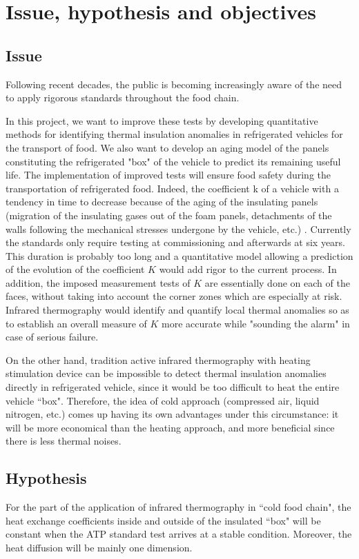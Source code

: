 \section*{Issue, hypothesis and objectives}
\subsection{Issue}

Following recent decades, the public is becoming increasingly aware of the need to apply rigorous standards throughout the food chain.

In this project, we want to improve these tests by developing quantitative methods for identifying thermal insulation anomalies in refrigerated vehicles for the transport of food. We also want to develop an aging model of the panels constituting the refrigerated "box" of the vehicle to predict its remaining useful life. The implementation of improved tests will ensure food safety during the transportation of refrigerated food.
Indeed, the coefficient k of a vehicle with a tendency in time to decrease because of the aging of the insulating panels (migration of the insulating gases out of the foam panels, detachments of the walls following the mechanical stresses undergone by the vehicle, etc.) . Currently the standards only require testing at commissioning and afterwards at six years. This duration is probably too long and a quantitative model allowing a prediction of the evolution of the coefficient $K$ would add rigor to the current process. In addition, the imposed measurement tests of $K$ are essentially done on each of the faces, without taking into account the corner zones which are especially at risk. Infrared thermography would identify and quantify local thermal anomalies so as to establish an overall measure of $K$ more accurate while "sounding the alarm" in case of serious failure.

On the other hand, tradition active infrared thermography with heating stimulation device can be impossible to detect thermal insulation anomalies directly in refrigerated vehicle, since it would be too difficult to heat the entire vehicle ``box". Therefore, the idea of cold approach (compressed air, liquid nitrogen, etc.) comes up having its own advantages under this circumstance: it will be more economical than the heating approach, and more beneficial since there is less thermal noises.

\subsection{Hypothesis}
For the part of the application of infrared thermography in ``cold food chain", the heat exchange coefficients inside and outside of the insulated ``box" will be constant when the ATP standard test arrives at a stable condition. Moreover, the heat diffusion will be mainly one dimension.

